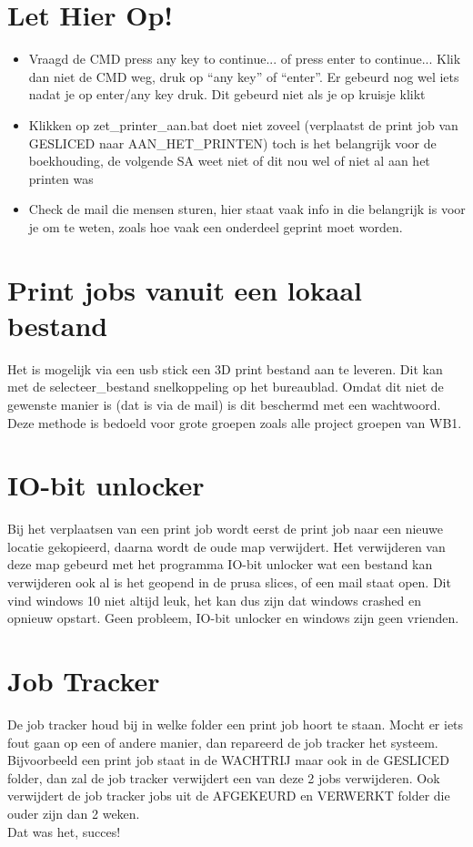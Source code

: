 \documentclass{article}
\newcommand{\quotes}[1]{``#1''}
\begin{document}
\section*{Let Hier Op!}
\begin{itemize}
  \item Vraagd de CMD press any key to continue... of press enter to continue... Klik dan niet de CMD weg, druk op \quotes{any key} of \quotes{enter}. Er gebeurd nog wel iets nadat je op enter/any key druk. Dit gebeurd niet als je op kruisje klikt
  \item Klikken op zet\_printer\_aan.bat doet niet zoveel (verplaatst de print job van GESLICED naar AAN\_HET\_PRINTEN) toch is het belangrijk voor de boekhouding, de volgende SA weet niet of dit nou wel of niet al aan het printen was
  \item Check de mail die mensen sturen, hier staat vaak info in die belangrijk is voor je om te weten, zoals hoe vaak een onderdeel geprint moet worden.
\end{itemize}

\section*{Print jobs vanuit een lokaal bestand}
Het is mogelijk via een usb stick een 3D print bestand aan te leveren. Dit kan met de selecteer\_bestand snelkoppeling op het bureaublad. Omdat dit niet de gewenste manier is (dat is via de mail) is dit beschermd met een wachtwoord. Deze methode is bedoeld voor grote groepen zoals alle project groepen van WB1. 

\section*{IO-bit unlocker}
Bij het verplaatsen van een print job wordt eerst de print job naar een nieuwe locatie gekopieerd, daarna wordt de oude map verwijdert. Het verwijderen van deze map gebeurd met het programma IO-bit unlocker wat een bestand kan verwijderen ook al is het geopend in de prusa slices, of een mail staat open. Dit vind windows 10 niet altijd leuk, het kan dus zijn dat windows crashed en opnieuw opstart. Geen probleem, IO-bit unlocker en windows zijn geen vrienden.

\section*{Job Tracker}
De job tracker houd bij in welke folder een print job hoort te staan. Mocht er iets fout gaan op een of andere manier, dan repareerd de job tracker het systeem. Bijvoorbeeld een print job staat in de WACHTRIJ maar ook in de GESLICED folder, dan zal de job tracker verwijdert een van deze 2 jobs verwijderen. Ook verwijdert de job tracker jobs uit de AFGEKEURD en VERWERKT folder die ouder zijn dan 2 weken.\\  

Dat was het, succes!
\end{document}
